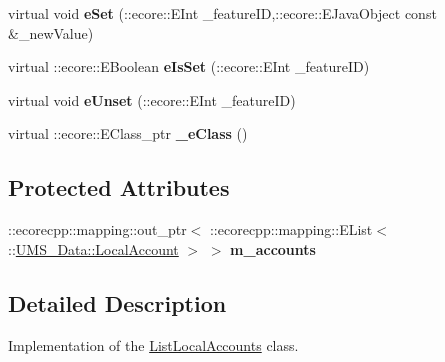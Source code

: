 \begin{DoxyCompactItemize}
\item 
\hypertarget{classUMS__Data_1_1ListLocalAccounts_a58168cd03742283c1550534fcb302526}{
virtual void {\bfseries eSet} (::ecore::EInt \_\-featureID,::ecore::EJavaObject const \&\_\-newValue)}
\label{classUMS__Data_1_1ListLocalAccounts_a58168cd03742283c1550534fcb302526}

\item 
\hypertarget{classUMS__Data_1_1ListLocalAccounts_aa35020707f3539b2bd469487bf0c1fff}{
virtual ::ecore::EBoolean {\bfseries eIsSet} (::ecore::EInt \_\-featureID)}
\label{classUMS__Data_1_1ListLocalAccounts_aa35020707f3539b2bd469487bf0c1fff}

\item 
\hypertarget{classUMS__Data_1_1ListLocalAccounts_ae5a8d03b4b592b76f41e1743c7588298}{
virtual void {\bfseries eUnset} (::ecore::EInt \_\-featureID)}
\label{classUMS__Data_1_1ListLocalAccounts_ae5a8d03b4b592b76f41e1743c7588298}

\item 
\hypertarget{classUMS__Data_1_1ListLocalAccounts_ac554881c09d8f7bf5fefe3f02fcfa5da}{
virtual ::ecore::EClass\_\-ptr {\bfseries \_\-eClass} ()}
\label{classUMS__Data_1_1ListLocalAccounts_ac554881c09d8f7bf5fefe3f02fcfa5da}

\end{DoxyCompactItemize}
\subsection*{Protected Attributes}
\begin{DoxyCompactItemize}
\item 
\hypertarget{classUMS__Data_1_1ListLocalAccounts_a7c7ec04a25797c4fb9899136cdc98310}{
::ecorecpp::mapping::out\_\-ptr$<$ ::ecorecpp::mapping::EList$<$ ::\hyperlink{classUMS__Data_1_1LocalAccount}{UMS\_\-Data::LocalAccount} $>$ $>$ {\bfseries m\_\-accounts}}
\label{classUMS__Data_1_1ListLocalAccounts_a7c7ec04a25797c4fb9899136cdc98310}

\end{DoxyCompactItemize}


\subsection{Detailed Description}
Implementation of the \hyperlink{classUMS__Data_1_1ListLocalAccounts}{ListLocalAccounts} class. 

